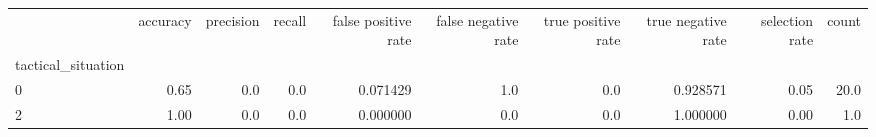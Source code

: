 \begin{tabular}{lrrrrrrrrr}
\toprule
{} &  accuracy &  precision &  recall &  false positive rate &  false negative rate &  true positive rate &  true negative rate &  selection rate &  count \\
tactical\_situation &           &            &         &                      &                      &                     &                     &                 &        \\
\midrule
0                  &      0.65 &        0.0 &     0.0 &             0.071429 &                  1.0 &                 0.0 &            0.928571 &            0.05 &   20.0 \\
2                  &      1.00 &        0.0 &     0.0 &             0.000000 &                  0.0 &                 0.0 &            1.000000 &            0.00 &    1.0 \\
\bottomrule
\end{tabular}
